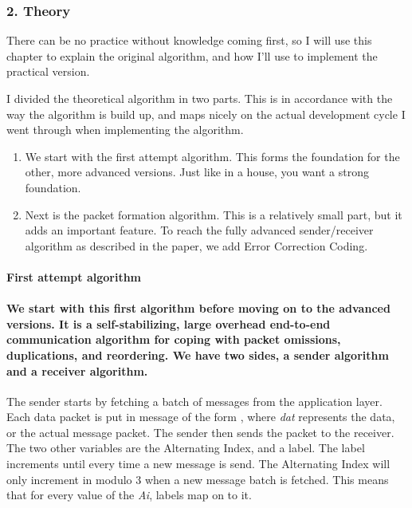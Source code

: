 \subsubsection{2. Theory}\label{theory}

There can be no practice without knowledge coming first, so I will use
this chapter to explain the original algorithm, and how I'll use to
implement the practical version.

I divided the theoretical algorithm in two parts. This is in accordance
with the way the algorithm is build up, and maps nicely on the actual
development cycle I went through when implementing the algorithm.

\begin{enumerate}
\def\labelenumi{\arabic{enumi}.}
\itemsep1pt\parskip0pt
\item
  We start with the first attempt algorithm. This forms the foundation
  for the other, more advanced versions. Just like in a house, you want
  a strong foundation.
\item
  Next is the packet formation algorithm. This is a relatively small
  part, but it adds an important feature. To reach the fully advanced
  sender/receiver algorithm as described in the paper, we add Error
  Correction Coding.
\end{enumerate}

\paragraph{First attempt algorithm\\\\We start with this first algorithm
before moving on to the advanced versions. It is a self-stabilizing,
large overhead end-to-end communication algorithm for coping with packet
omissions, duplications, and reordering. We have two sides, a sender
algorithm and a receiver
algorithm.}\label{first-attempt-algorithm-we-start-with-this-first-algorithm-before-moving-on-to-the-advanced-versions.-it-is-a-self-stabilizing-large-overhead-end-to-end-communication-algorithm-for-coping-with-packet-omissions-duplications-and-reordering.-we-have-two-sides-a-sender-algorithm-and-a-receiver-algorithm.}

The sender starts by fetching a batch of messages from the application
layer. Each data packet is put in message of the form \textbf{}, where
\emph{dat} represents the data, or the actual message packet. The sender
then sends the packet to the receiver. The two other variables are the
Alternating Index, and a label. The label increments until \emph{} every
time a new message is send. The Alternating Index will only increment in
modulo 3 when a new message batch is fetched. This means that for every
value of the \emph{Ai}, \emph{} labels map on to it.

